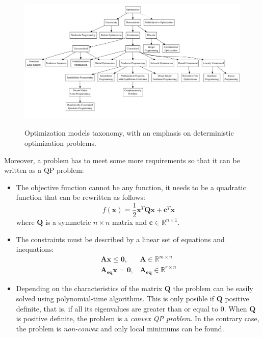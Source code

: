 \begin{figure}[H]
    \caption[Optimization models taxonomy, with an emphasis on deterministic optimization problems.]{
        Optimization models taxonomy, with an emphasis on deterministic optimization problems.
    }
    \centering
    \includegraphics[width=\textwidth]{figs/optimizationtaxonomy.jpeg}
\label{fig:optimizationtaxonomy}
\end{figure}

Moreover, a problem has to meet some more requirements so that it can be written as a QP problem:

\begin{itemize}
    \item The objective function cannot be any function, it needs to be a quadratic function that can be rewritten as follows:
    $$
    f(\mathbf{x}) = \frac{1}{2} \mathbf{x}^{T} \mathbf{Q} \mathbf{x}+\mathbf{c}^{T} \mathbf{x}
    $$
    where $\mathbf{Q}$ is a symmetric $n \times n$ matrix and $\mathbf{c} \in \mathbb{R}^{n \times 1}$.
    \item The constraints must be described by a linear set of equations and inequations:
    $$
    \begin{array}{ll}
        \mathbf{A} \mathbf{x} \leq \mathbf{0}, & \mathbf{A} \in \mathbb{R}^{m \times n} \\
        \mathbf{A_{eq}} \mathbf{x} = \mathbf{0}, & \mathbf{A_{eq}} \in \mathbb{R}^{r \times n}
    \end{array}
    $$
    \item Depending on the characteristics of the matrix $\mathbf{Q}$ the problem can be easily solved using polynomial-time algorithms. This is only posible if $\mathbf{Q}$ positive definite, that is, if all its eigenvalues are greater than or equal to $0$. When $\mathbf{Q}$ is positive definite, the problem is a \textit{convex QP problem}. In the contrary case, the problem is \textit{non-convex} and only local minimums can be found.
\end{itemize}

